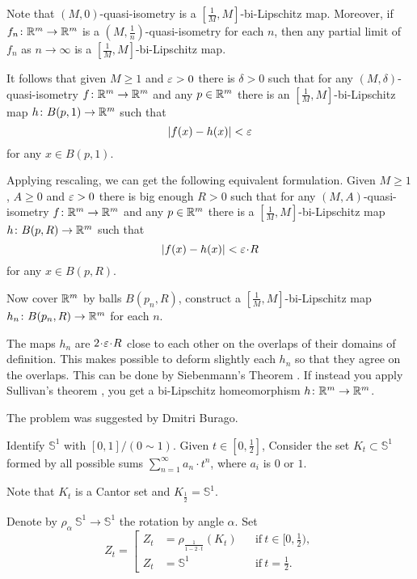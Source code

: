 {\sloppy
Note that $(M,0)$-quasi-isometry is a $[\tfrac1M,M]$-bi-Lipschitz map.
Moreover,
if $f_n\colon\mathbb{R}^m\to\mathbb{R}^m$ is a  $(M,\frac1n)$-quasi-isometry 
for each $n$, 
then any partial limit of $f_n$ as $n\to\infty$
is a $[\tfrac1M,M]$-bi-Lipschitz map.

}

It follows that given $M\ge 1$ and $\varepsilon>0$ there is $\delta>0$ such that 
for any $(M,\delta)$-quasi-isometry $f\colon\mathbb{R}^m\to\mathbb{R}^m$ and any $p\in \mathbb{R}^m$
there is an $[\tfrac1M,M]$-bi-Lipschitz map $h\colon B(p,1)\to \mathbb{R}^m$
such that
\[|f(x)-h(x)|<\varepsilon\]
for any $x\in B(p,1)$.

Applying rescaling, we can get the following equivalent formulation. 
Given $M\ge 1$, $A\ge 0$ and $\varepsilon>0$
there is big enough $R>0$ such that for any $(M,A)$-quasi-isometry 
$f\colon\mathbb{R}^m\to\mathbb{R}^m$ and any $p\in\mathbb{R}^m$ there is a $[\tfrac1M,M]$-bi-Lipschitz map $h\colon B(p,R)\to \mathbb{R}^m$
such that 
\[|f(x)-h(x)|<\eps\cdot R\]
for any $x\in B(p,R)$.

Now cover $\mathbb{R}^m$ by balls
$B(p_n,R)$, construct a $[\tfrac1M,M]$-bi-Lipschitz map $h_n\colon B(p_n,R)\to \mathbb{R}^m$ for each $n$.

The maps $h_n$ are $2\cdot \eps\cdot R$ close to each other on the overlaps of their domains of definition.
This makes possible to deform slightly each $h_n$ so that they agree on the overlaps.
This can be done by Siebenmann's Theorem \cite{siebenmann}.
If instead you apply Sullivan's theorem \cite{sullivan}, you get a bi-Lipschitz homeomorphism $h\colon\mathbb{R}^m\to\mathbb{R}^m$.\qeds


The problem was suggested by Dmitri Burago.





Identify $\mathbb{S}^1$ with $[0,1]/(0\sim 1)$.
Given $t\in[0,\tfrac12]$,
Consider the set $K_t\subset \mathbb{S}^1$
formed by all possible sums $\sum_{n=1}^\infty a_n\cdot t^n$,
where $a_i$ is $0$ or $1$.

Note that $K_{t}$ is a Cantor set and $K_{\frac12}=\mathbb{S}^1$.

Denote by $\rho_\alpha\:\mathbb{S}^1\to\mathbb{S}^1$ 
the rotation by angle $\alpha$.
Set 
\[Z_t=\left[\begin{aligned}
             Z_t&=\rho_{\frac1{1-2\cdot t}}(K_t)&&\text{if}\ t\in[0,\tfrac12),
\\
Z_{t}&=\mathbb{S}^1&&\text{if}\ t=\tfrac12.
            \end{aligned}
\right.
\]


